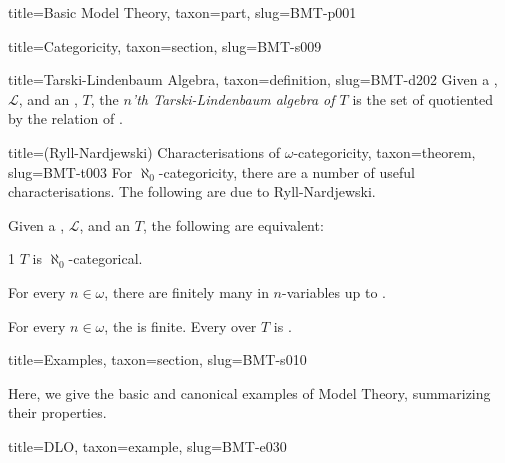 \documentclass[a4paper]{article}
\begin{document}
\begin{tree}{title={Basic Model Theory}, taxon={part}, slug={BMT-p001}}
\begin{tree}{title={Categoricity}, taxon={section}, slug={BMT-s009}}
\begin{tree}{title={Tarski-Lindenbaum Algebra}, taxon={definition}, slug={BMT-d202}}
Given a , \(\mathcal {L}\), and an , \(T\), the \emph{\(n\)'th Tarski-Lindenbaum algebra of \(T\)} is the set of  quotiented by the relation of .
\end{tree}

\begin{tree}{title={(Ryll-Nardjewski) Characterisations of \(\omega\)-categoricity}, taxon={theorem}, slug={BMT-t003}}
For \(\aleph _0\)-categoricity, there are a number of useful characterisations. The following are due to Ryll-Nardjewski.\par{Given a , \(\mathcal {L}\), and an  \(T\), the following are equivalent:}\par{1 \(T\) is \(\aleph _0\)-categorical.}\par{For every \(n \in   \omega\), there are finitely many  in \(n\)-variables up to .}\par{For every \(n \in   \omega\), the  is finite. 
Every  over \(T\) is . }
\end{tree}

\end{tree}


  
  
\begin{tree}{title={Examples}, taxon={section}, slug={BMT-s010}}

    Here, we give the basic and canonical examples of Model Theory, summarizing their properties.

\begin{tree}{title={DLO}, taxon={example}, slug={BMT-e030}}


\end{tree}
\end{tree}
\end{tree}
\end{document}
